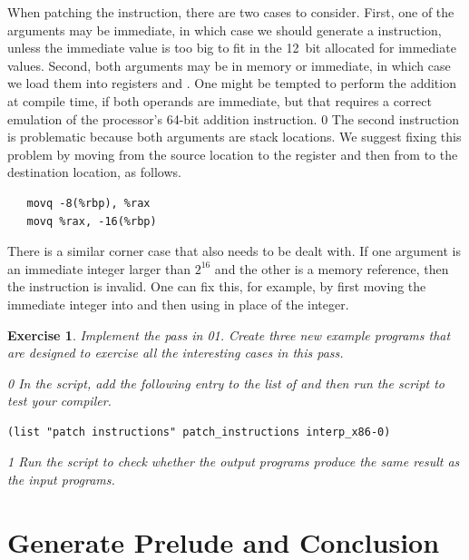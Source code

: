 \documentclass[7x10]{TimesAPriori_MIT}%
\def\racketEd{0}
\def\pythonEd{1}
\def\edition{1}
\def\xeightysixEd{0}
\def\architecture{1}
\newcommand{\racket}[1]{{\if\edition\racketEd{#1}\fi}}
\newcommand{\pythonColor}[0]{}
\newcommand{\python}[1]{{\if\edition\pythonEd\pythonColor #1\fi}}
\newtheorem{exercise}[theorem]{Exercise}
\numberwithin{theorem}{chapter}
\numberwithin{definition}{chapter}
\numberwithin{equation}{chapter}
\begin{document}
When patching the  instruction, there are two cases
to consider. First, one of the arguments may be immediate, in which
case we should generate a  instruction, unless the
immediate value is too big to fit in the 12~bit allocated for
immediate values. Second, both
arguments may be in memory or immediate, in which case we load them into registers
 and . One might be tempted to perform the addition at
compile time, if both operands are immediate, but that requires a
correct emulation of the processor's 64-bit addition instruction.
\fi
\if\architecture\xeightysixEd
The second  instruction is problematic because both
arguments are stack locations.
We suggest fixing this problem by
moving from the source location to the register  and then
from  to the destination location, as follows.
\begin{lstlisting}
   movq -8(%rbp), %rax
   movq %rax, -16(%rbp)
\end{lstlisting}

There is a similar corner case that also needs to be dealt with. If
one argument is an immediate integer larger than $2^{16}$ and the
other is a memory reference, then the instruction is invalid.  One can
fix this, for example, by first moving the immediate integer into
 and then using  in place of the integer.
\fi

\begin{exercise}
\normalfont\normalsize Implement the  pass in
\racket{}\python{}.
Create three new example programs that are
designed to exercise all the interesting cases in this pass.
%
{\if\edition\racketEd
In the  script, add the following entry to the
list of  and then run the script to test your compiler.
\begin{lstlisting}
(list "patch instructions" patch_instructions interp_x86-0)
\end{lstlisting}
\fi}
{\if\edition\pythonEd\pythonColor
Run the  script to check
whether the output programs produce the same result as the input
programs.
\fi}
\end{exercise}


\section{Generate Prelude and Conclusion}
\label{sec:print-x86}
\end{document}
